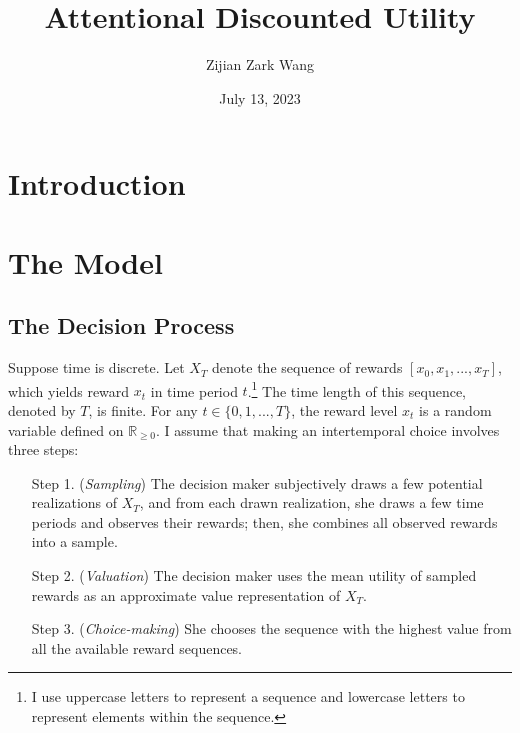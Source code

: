 \documentclass[
  12pt,
]{article}
\title{Attentional Discounted Utility}
\author{Zijian Zark Wang}
\date{July 13, 2023}
\begin{document}
\maketitle

\hypertarget{introduction}{%
\section{Introduction}\label{introduction}}

\hypertarget{the-model}{%
\section{The Model}\label{the-model}}

\hypertarget{the-decision-process}{%
\subsection{The Decision Process}\label{the-decision-process}}

Suppose time is discrete. Let \(X_T\) denote the sequence of rewards
\([x_0,x_1,...,x_T]\), which yields reward \(x_t\) in time period
\(t\).\footnote{I use uppercase letters to represent a sequence and
  lowercase letters to represent elements within the sequence.} The time
length of this sequence, denoted by \(T\), is finite. For any
\(t \in \{0,1,...,T\}\), the reward level \(x_t\) is a random variable
defined on \(\mathbb{R}_{\geq 0}\). I assume that making an
intertemporal choice involves three steps:

\begin{itemize}[leftmargin=2cm]
\item[Step 1.] (\textit{Sampling}) The decision maker subjectively draws a few potential realizations of $X_T$, and from each drawn realization, she draws a few time periods and observes their rewards; then, she combines all observed rewards into a sample.

\item[Step 2.] (\textit{Valuation}) The decision maker uses the mean utility of sampled rewards as an approximate value representation of $X_T$.

\item[Step 3.] (\textit{Choice-making}) She chooses the sequence with the highest value from all the available reward sequences.
\end{itemize}
\end{document}
